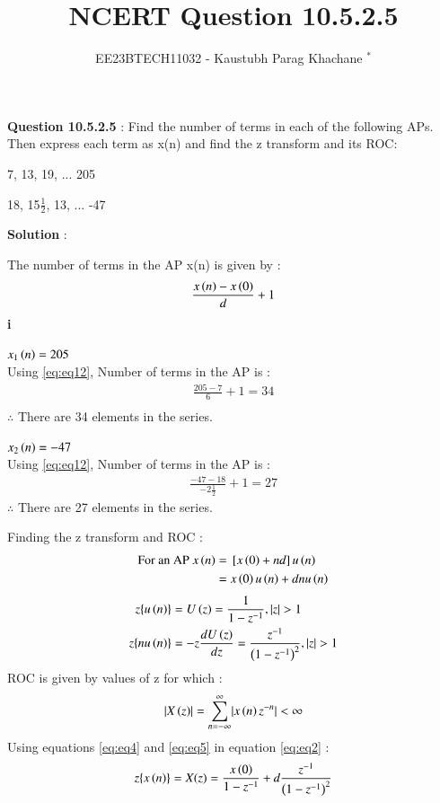 \documentclass[journal,12pt,twocolumn]{IEEEtran}
\theoremstyle{remark}
\begin{document}

\vspace{3cm}

\Large\title{NCERT Question 10.5.2.5}
\large\author{EE23BTECH11032 - Kaustubh Parag Khachane $^{*}$%
}
\maketitle
\newpage
\bigskip

\renewcommand{\thefigure}{\theenumi}
\renewcommand{\thetable}{\theenumi}
\large\textbf{Question 10.5.2.5} : \normalsize Find the number of terms in each of the following APs. Then express each term as x(n) and find the z transform and its ROC: 

 7, 13, 19, ... 205

 18, 15$\frac{1}{2}$, 13, ... -47


\large\textbf{Solution} :\normalsize


The number of terms in the AP x(n) is given by : 
\begin{align}  \label{eq:eq12}
    \frac{x\left(n\right) - x\left(0\right)}{d} + 1
\end{align}
\textbf{\brak i} 

$x_{1}\left(n\right) = 205$\\ 
Using \eqref{eq:eq12}, Number of terms in the AP is : 
\begin{align}
\frac{205 - 7}{6} + 1 = 34\\
\end{align}
$\therefore$ There are 34 elements in the series.

\textbf{} 

$x_{2}\left(n\right) = -47$\\ 
Using \eqref{eq:eq12}, Number of terms in the AP is :
\begin{align}
\frac{-47 - 18}{-2\frac{1}{2}} + 1 = 27
\end{align}
$\therefore$ There are 27 elements in the series.

Finding the z transform and ROC : \\
\begin{align}
\text{For an AP } x\left(n\right) &= {}\left[x\left(0\right) + nd\right]u\left(n\right)\\
&=x\left(0\right)u\left(n\right) + dnu\left(n\right)\label{eq:eq2}
\end{align}
\begin{align}
   z\{u\left(n\right)\} &=  U\left(z\right) = \frac{1}{1 - z^{-1}} , |z| > 1\label{eq:eq4}\\
   z\{nu\left(n\right)\} &= -z\frac{dU\left(z\right)}{dz} = \frac{z^{-1}}{\left(1-z^{-1}\right)^2},|z| > 1 \label{eq:eq5}
\end{align}
ROC is given by values of z for which :
\begin{align}
    \lvert X\left(z\right)\rvert = \sum_{n = -\infty}^{\infty}\lvert x\left(n\right)z^{-n}\rvert < \infty
\end{align}
Using equations \eqref{eq:eq4} and \eqref{eq:eq5} in equation \eqref{eq:eq2} :
\begin{align}\label{eq:eq3}
    z\{x\left(n\right)\} = X(z) = \frac{x\left(0\right)}{1 - z^{-1}} + d\frac{z^{-1}}{\left(1-z^{-1}\right)^2}
\end{align}
\textbf{}
\end{document}
